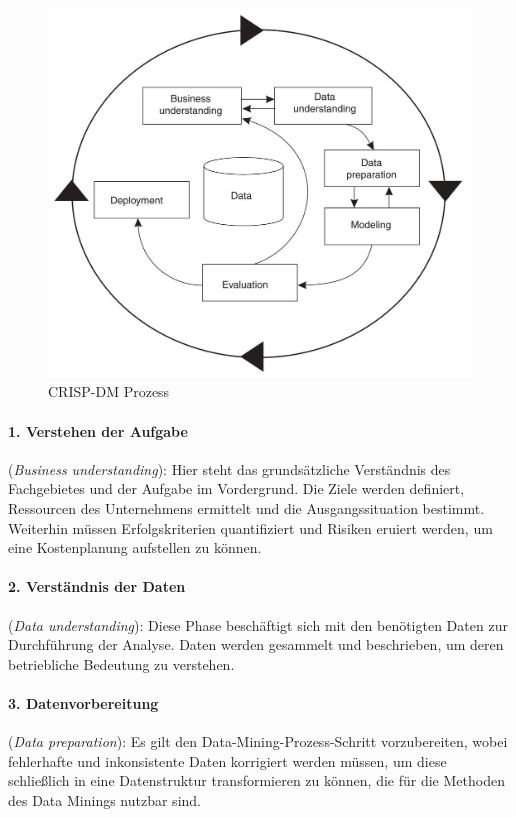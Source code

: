 \begin{figure}[H]
\centering
\includegraphics[scale=0.9]{se-wa-jpg/crisp}
\caption[CRISP-DM Prozess]{CRISP-DM Prozess\protect\footnotemark}
\label{crisp}
\end{figure}

\paragraph{1. Verstehen der Aufgabe}(\textit{Business understanding}): 
Hier steht das grundsätzliche Verständnis des Fachgebietes und der Aufgabe im Vordergrund. Die Ziele werden definiert, Ressourcen des Unternehmens ermittelt und die Ausgangssituation bestimmt. Weiterhin müssen Erfolgskriterien quantifiziert und Risiken eruiert werden, um eine Kostenplanung aufstellen zu können. 
\paragraph{2. Verständnis der Daten}(\textit{Data understanding}): 
Diese Phase beschäftigt sich mit den benötigten Daten zur Durchführung der Analyse. Daten werden gesammelt und beschrieben, um deren betriebliche Bedeutung zu verstehen.
\paragraph{3. Datenvorbereitung}(\textit{Data preparation}): 
Es gilt den Data-Mining-Prozess-Schritt vorzubereiten, wobei fehlerhafte und inkonsistente Daten korrigiert werden müssen, um diese schließlich in eine Datenstruktur transformieren zu können, die für die Methoden des Data Minings nutzbar sind.
